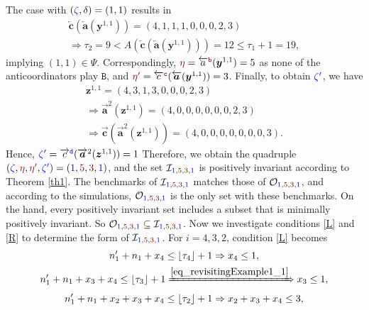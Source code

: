 \documentclass[10 pt,twocolumn,journal]{IEEEtran}
\DeclarePairedDelimiter{\floor}{\lfloor}{\rfloor}
\theoremstyle{plain}
\newcommand{\I}{\mathcal{I}}
\newcommand{\y}{\bm{y}}
\newcommand{\z}{\bm{z}}
\renewcommand{\a}{\bm{a}}
\renewcommand{\c}{\bm{c}}
\renewcommand{\r}{\tb{\zeta}}
\newcommand{\rr}{\tb{\zeta'}}
\newcommand{\s}{\tr{\eta}}
\renewcommand{\ss}{\tr{\eta'}}
\renewcommand{\d}{{\delta}}
\renewcommand{\o}{\tr{\mathtt{b}}}
\newcommand{\oo}{\tr{\mathtt{c}}}
\newcommand{\nn}{\tb{\mathtt{d}}}
\newcommand{\B}{\mathtt{B}}
\newcommand{\tb}{\textcolor{blue}}
\newcommand{\tr}{\textcolor{Myred}}
\theoremstyle{definition}
\begin{document}
The case with $(\r,\d) = (1,1)$ results in 
\begin{gather*}
    \overleftarrow{\c}(\overleftarrow{\a}(\y^{1,1})) 
    = (4,1,1,1,0,0,0,2,3)\\
    \Rightarrow
    {\tau_{2}} = 9 < A(\overleftarrow{\c}(\overleftarrow{\a}(\y^{1,1}))) = 12 \leq {\tau_1} + 1 = 19, 
\end{gather*}
implying $(1,1)\in\Psi$.
Correspondingly, $\s = \overleftarrow{a}^{\o}(\y^{1,1}) = 5$ as none of the anticoordinators play $\B$, and $\ss = \overleftarrow{c}^{\oo}(\overleftarrow{\a}(\y^{1,1})) = 3$. 
Finally, to obtain $\rr$, we have
\begin{gather*}
    \z^{1,1} = 
    (4,3,1,3,0,0,0,2,3)\\
    \Rightarrow
    \overrightarrow{\a}^{2}(\z^{1,1}) = 
    (4,0,0,0,0,0,0,2,3)\\
    \Rightarrow
    \overrightarrow{\c}(\overrightarrow{\a}^{2}(\z^{1,1})) = 
    (4,0,0,0,0,0,0,0,3).
\end{gather*}
Hence, $\rr= \overrightarrow{c}^{\nn}(\overrightarrow{\a}^{2}(\z^{1,1})) = 1$
Therefore, we obtain the quadruple $(\r,\s,\ss,\rr) = (\tb{1},\tr{5},\tr{3},\tb{1})$, and the set $\I_{\tb{1},\tr{5},\tr{3},\tb{1}}$ is positively invariant according to Theorem \ref{th1}. 
The benchmarks of $\I_{\tb{1},\tr{5},\tr{3},\tb{1}}$ matches those of $\mathcal{O}_{\tb{1}, \tr{5}, \tr{3}, \tb{1}}$, and according to the simulations, $\mathcal{O}_{\tb{1}, \tr{5}, \tr{3}, \tb{1}}$ is the only set with these benchmarks.
On the hand, every positively invariant set includes a subset that is minimally positively invariant.
So $\mathcal{O}_{\tb{1}, \tr{5}, \tr{3}, \tb{1}}\subseteq\I_{\tb{1},\tr{5},\tr{3},\tb{1}} $.
Now we investigate conditions \eqref{L} and \eqref{R} to determine the form of $\I_{\tb{1},\tr{5},\tr{3},\tb{1}}$.
For $i=4,3,2$, condition \eqref{L} becomes
\begin{gather} 
         n'_1 + n_1 + x_4 \leq \floor{\tau_4}+1 
         \Rightarrow 
         x_4 \leq 1, \label{eq_revisitingExample1_1}\\
         n'_1 + n_1 + x_3 + x_4 \leq \floor{\tau_3}+1
         \xRightarrow{\eqref{eq_revisitingExample1_1}} 
         x_3 \leq 1,\nonumber\\
         n'_1 + n_1 + x_2 + x_3 + x_4 \leq \floor{\tau_2}+1
         \Rightarrow
         x_2 + x_3 + x_4 \leq 3,\nonumber
\end{gather}    
\end{document}
